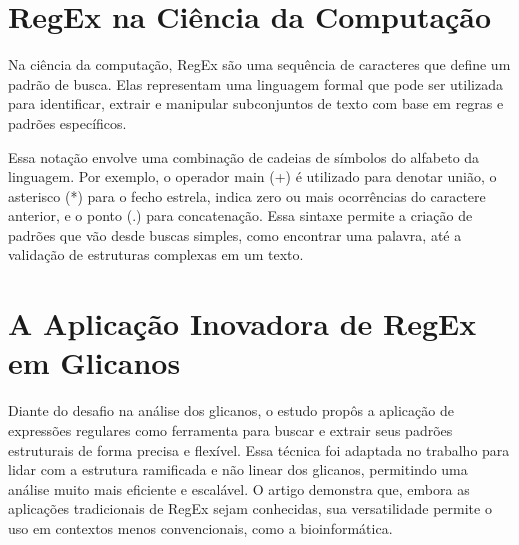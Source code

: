 \section{RegEx na Ciência da Computação}

Na ciência da computação, RegEx são uma sequência de caracteres que define um padrão de busca. Elas representam uma linguagem formal que pode ser utilizada para identificar, extrair e manipular subconjuntos de texto com base em regras e padrões específicos.

Essa notação envolve uma combinação de cadeias de símbolos do alfabeto da linguagem. Por exemplo, o operador main (+) é utilizado para denotar união, o asterisco (*) para o fecho estrela, indica zero ou mais ocorrências do caractere anterior, e o ponto (.) para concatenação. Essa sintaxe permite a criação de padrões que vão desde buscas simples, como encontrar uma palavra, até a validação de estruturas complexas em um texto.

\section{A Aplicação Inovadora de RegEx em Glicanos}

Diante do desafio  na análise dos glicanos, o estudo propôs a aplicação de expressões regulares como ferramenta para buscar e extrair seus padrões estruturais de forma precisa e flexível. Essa técnica foi adaptada no trabalho para lidar com a estrutura ramificada e não linear dos glicanos, permitindo uma análise muito mais eficiente e escalável. O artigo demonstra que, embora as aplicações tradicionais de RegEx sejam conhecidas, sua versatilidade permite o uso em contextos menos convencionais, como a bioinformática.